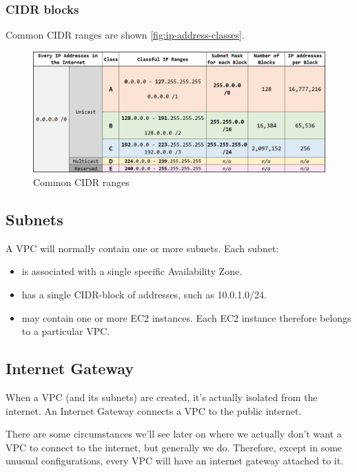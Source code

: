 \subsubsection{CIDR blocks}

Common CIDR ranges are shown \autoref{fig:ip-address-classes}.

\begin{figure}[htbp]
  \centering
  \includegraphics[width=1.0\linewidth]{ip_address_classes}
  \caption{Common CIDR ranges}
  \label{fig:ip-address-classes}
\end{figure}

\subsection{Subnets}

A VPC will normally contain one or more subnets. 
Each subnet:

\begin{itemize}
\item
  is associated with a single specific Availability Zone.
\item
  has a single CIDR-block of addresses, such as 10.0.1.0/24.
\item
  may contain one or more EC2 instances.
  Each EC2 instance therefore belongs to a particular VPC.
\end{itemize}

\subsection{Internet Gateway}

When a VPC (and its subnets) are created, it's actually isolated from the internet.
An Internet Gateway connects a VPC to the public internet.

There are some circumstances we'll see later on where we actually don't want a VPC to connect to the internet, but generally we do.
Therefore, except in some unusual configurations, every VPC will have an internet gateway attached to it.

